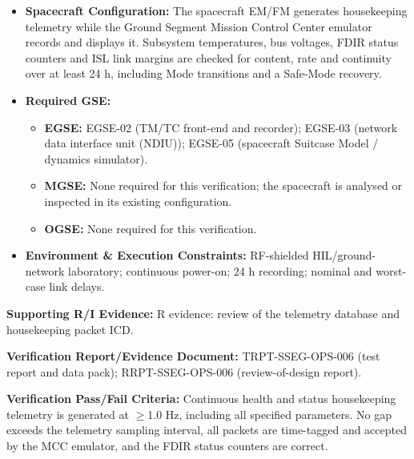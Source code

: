 \begin{itemize}
\item \textbf{Spacecraft Configuration:} The spacecraft EM/FM generates housekeeping telemetry while the Ground Segment Mission Control Center emulator records and displays it. Subsystem temperatures, bus voltages, FDIR status counters and ISL link margins are checked for content, rate and continuity over at least 24 h, including Mode transitions and a Safe-Mode recovery.
\item \textbf{Required GSE:}
\begin{itemize}
\item \textbf{EGSE:} EGSE-02 (TM/TC front-end and recorder); EGSE-03 (network data interface unit (NDIU)); EGSE-05 (spacecraft Suitcase Model / dynamics simulator).
\item \textbf{MGSE:} None required for this verification; the spacecraft is analysed or inspected in its existing configuration.
\item \textbf{OGSE:} None required for this verification.
\end{itemize}
\item \textbf{Environment \& Execution Constraints:} RF-shielded HIL/ground-network laboratory; continuous power-on; 24 h recording; nominal and worst-case link delays.
\end{itemize}
\par\textbf{Supporting R/I Evidence:} R evidence: review of the telemetry database and housekeeping packet ICD.
\par\textbf{Verification Report/Evidence Document:} TRPT-SSEG-OPS-006 (test report and data pack); RRPT-SSEG-OPS-006 (review-of-design report).
\par\textbf{Verification Pass/Fail Criteria:} Continuous health and status housekeeping telemetry is generated at $\ge$1.0 Hz, including all specified parameters. No gap exceeds the telemetry sampling interval, all packets are time-tagged and accepted by the MCC emulator, and the FDIR status counters are correct.
\par\medskip
